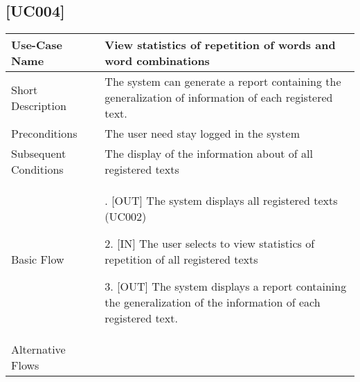 \documentclass[11pt, twoside, a4paper]{book}
\begin{document}
			\subsection{[UC004]}			
				\begin{tabular}{|>{\centering\arraybackslash}m{3cm} |>{	\arraybackslash}m{9cm}|}										   			   \hline
					Use-Case Name 			& [UC004] View statistics of repetition of words and word combinations											\\ \hline
					Short Description  		& The system can generate a report containing the generalization of information of each registered text.    	\\ \hline	
					Preconditions  			& The user need stay logged in the system      																	\\ \hline
					Subsequent Conditions	& The display of the information about of all registered texts													\\ \hline
					Basic Flow  			& 	1. [OUT] The system displays all registered texts (UC002)   													
											  
												2. [IN] The user selects to view statistics of repetition of all registered texts											
											  
												3. [OUT] The system displays a report containing the generalization of the information of each registered text.	\\ \hline
				Alternative Flows  		&       																											\\ \hline
			\end{tabular}
\end{document}
